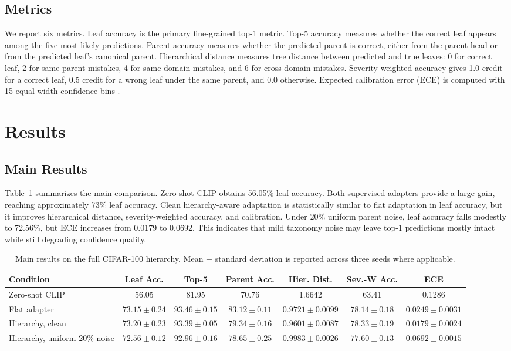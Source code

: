 \documentclass[conference]{IEEEtran}
\begin{document}
\subsection{Metrics}
We report six metrics. Leaf accuracy is the primary fine-grained top-1 metric.
Top-5 accuracy measures whether the correct leaf appears among the five most
likely predictions. Parent accuracy measures whether the predicted parent is
correct, either from the parent head or from the predicted leaf's canonical
parent. Hierarchical distance measures tree distance between predicted and
true leaves: 0 for correct leaf, 2 for same-parent mistakes, 4 for same-domain
mistakes, and 6 for cross-domain mistakes. Severity-weighted accuracy gives
1.0 credit for a correct leaf, 0.5 credit for a wrong leaf under the same
parent, and 0.0 otherwise. Expected calibration error (ECE) is computed with
15 equal-width confidence bins \cite{guo2017calibration}.

\section{Results}
\subsection{Main Results}
Table~\ref{tab:main} summarizes the main comparison. Zero-shot CLIP obtains
56.05\% leaf accuracy. Both supervised adapters provide a large gain, reaching
approximately 73\% leaf accuracy. Clean hierarchy-aware adaptation is
statistically similar to flat adaptation in leaf accuracy, but it improves
hierarchical distance, severity-weighted accuracy, and calibration. Under
20\% uniform parent noise, leaf accuracy falls modestly to 72.56\%, but ECE
increases from 0.0179 to 0.0692. This indicates that mild taxonomy noise may
leave top-1 predictions mostly intact while still degrading confidence quality.

\begin{table}[t]
\centering
\caption{Main results on the full CIFAR-100 hierarchy. Mean $\pm$ standard deviation is reported across three seeds where applicable.}
\label{tab:main}
\begin{tabular}{lcccccc}
\toprule
Condition & Leaf Acc. & Top-5 & Parent Acc. & Hier. Dist. & Sev.-W Acc. & ECE \\
\midrule
Zero-shot CLIP & 56.05 & 81.95 & 70.76 & 1.6642 & 63.41 & 0.1286 \\
Flat adapter & $73.15 \pm 0.24$ & $93.46 \pm 0.15$ & $83.12 \pm 0.11$ & $0.9721 \pm 0.0099$ & $78.14 \pm 0.18$ & $0.0249 \pm 0.0031$ \\
Hierarchy, clean & $73.20 \pm 0.23$ & $93.39 \pm 0.05$ & $79.34 \pm 0.16$ & $0.9601 \pm 0.0087$ & $78.33 \pm 0.19$ & $0.0179 \pm 0.0024$ \\
Hierarchy, uniform 20\% noise & $72.56 \pm 0.12$ & $92.96 \pm 0.16$ & $78.65 \pm 0.25$ & $0.9983 \pm 0.0026$ & $77.60 \pm 0.13$ & $0.0692 \pm 0.0015$ \\
\bottomrule
\end{tabular}
\end{table}
\end{document}
